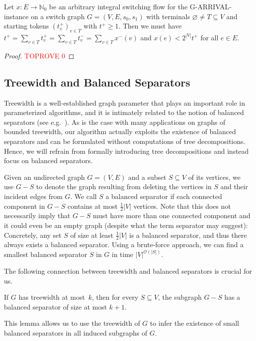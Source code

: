 \documentclass[a4paper,UKenglish,cleveref, autoref, thm-restate]{lipics-v2021}
\newcommand{\N}{\mathbb{N}}
\newcommand{\bigO}{\mathcal{O}}
\let\emptyset\varnothing
\newcommand{\problem}[1]{\textrm{#1}}
\newcommand{\garrival}{\problem{G-ARRIVAL}}
\begin{document}
\begin{lemma}
\label{lemma:upper_bound_flow}
    Let $x : E \rightarrow \N_0$ be an arbitrary integral switching flow for the \garrival-instance on a switch graph $G = (V, E, s_0, s_1)$ with terminals $\emptyset \neq T \subseteq V$ and starting tokens $(t^+_v)_{v \in T}$ with $t^+ \geq 1$. Then we must have $t^+ = \sum_{v \in T} t^+_v = \sum_{v \in T} t^-_v = \sum_{v \in T} x^-(v)$ and $x(e) < 2^{|V|}t^+$ for all $e \in E$.
\end{lemma}
\begin{proof}\textcolor{red}{TOPROVE 0}\end{proof}

\subsection{Treewidth and Balanced Separators}
\label{ssec:treewidth_separators}

Treewidth is a well-established graph parameter that plays an important role in parameterized algorithms, and it is intimately related to the notion of balanced separators (see e.g.\@~\cite[Chapter~7]{cyganParameterizedAlgorithms2015}). As is the case with many applications on graphs of bounded treewidth, our algorithm actually exploits the existence of balanced separators and can be formulated without computations of tree decompositions. Hence, we will refrain from formally introducing tree decompositions and instead focus on balanced separators. 

Given an undirected graph $G = (V, E)$ and a subset $S \subseteq V$ of its vertices, we use $G - S$ to denote the graph resulting from deleting the vertices in $S$ and their incident edges from $G$. We call $S$ a balanced separator if each connected component in $G - S$ contains at most $\frac{1}{2}|V|$ vertices. Note that this does not necessarily imply that $G - S$ must have more than one connected component and it could even be an empty graph (despite what the term separator may suggest): Concretely, any set $S$ of size at least $\frac{1}{2}|V|$ is a balanced separator, and thus there always exists a balanced separator. Using a brute-force approach, we can find a smallest balanced separator $S$ in $G$ in time $|V|^{\bigO(|S|)}$.

The following connection between treewidth and balanced separators is crucial for us.

\begin{lemma}
\label{lemma:existence_balanced_separator}
    If $G$ has treewidth at most~$k$, then for every $S \subseteq V$, the subgraph $G - S$ has a balanced separator of size at most $k + 1$.
\end{lemma}
This lemma allows us to use the treewidth of $G$ to infer the existence of small balanced separators in all induced subgraphs of $G$.
\end{document}
